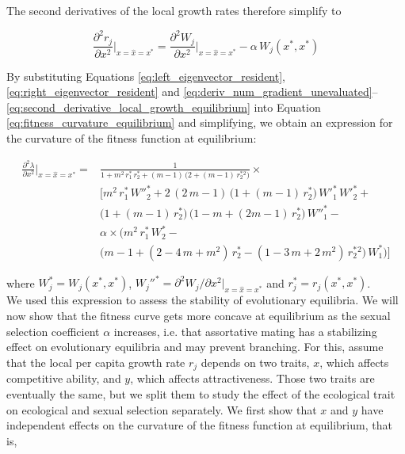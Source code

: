 The second derivatives of the local growth rates therefore simplify to

\begin{equation}
    \frac{\partial^2 r_j}{\partial x^2}\bigg|_{x=\hat{x}=x^*}= \frac{\partial^2 W_j}{\partial x^2}\bigg|_{x=\hat{x}=x^*} - \alpha \, W_j(x^*,x^*)
    \label{eq:second_derivative_local_growth_equilibrium}
\end{equation}

By substituting Equations \ref{eq:left_eigenvector_resident}, \ref{eq:right_eigenvector_resident} and \ref{eq:deriv_num_gradient_unevaluated}--\ref{eq:second_derivative_local_growth_equilibrium} into Equation \ref{eq:fitness_curvature_equilibrium} and simplifying, we obtain an expression for the curvature of the fitness function at equilibrium:

\begin{equation}
    \begin{split}
        \frac{\partial^2 \lambda}{\partial x^2}\bigg|_{x=\hat x=x^*}=&\frac{1}{1 + m^2\,r^*_1\,r^*_2 + (m - 1)\,\big(2 + (m - 1)\,r^*_2^2\big)} \times \\
        &\Bigg[m^2\, r^*_ 1\, W''^*_2 + 2\, (2\, m - 1)\, \big(1 + (m - 1)\, r^*_ 2\big)\, W'^*_1 \, W'^*_2 +\\
        &\big(1 + (m - 1) \, r^*_ 2\big)\, \big(1 - m + (2 m - 1) \,r^*_ 2\big)\, W''^*_1 -\\
        &\alpha \times \Big(m^2\, r^*_ 1\, W^*_2 - \\
        & \big(m - 1 + (2 - 4\,m + m^2)\, r^*_ 2 - (1 - 3\,m + 2\,m^2)\,r^*_ 2^2\big)\,W^*_1 \Big)\Bigg]
    \end{split}
    \label{eq:fitness_curvature_equilibrium_expression}
\end{equation}

where $W_j^* = W_j(x^*, x^*)$, $W_j''^* = \partial^2 W_j / \partial x^2 |_{x=\hat{x}=x^*}$ and $r_j^* = r_j(x^*, x^*)$.\\

We used this expression to assess the stability of evolutionary equilibria. We will now show that the fitness curve gets more concave at equilibrium as the sexual selection coefficient $\alpha$ increases, i.e. that assortative mating has a stabilizing effect on evolutionary equilibria and may prevent branching. For this, assume that the local per capita growth rate $r_j$ depends on two traits, $x$, which affects competitive ability, and $y$, which affects attractiveness. Those two traits are eventually the same, but we split them to study the effect of the ecological trait on ecological and sexual selection separately. We first show that $x$ and $y$ have independent effects on the curvature of the fitness function at equilibrium, that is,

